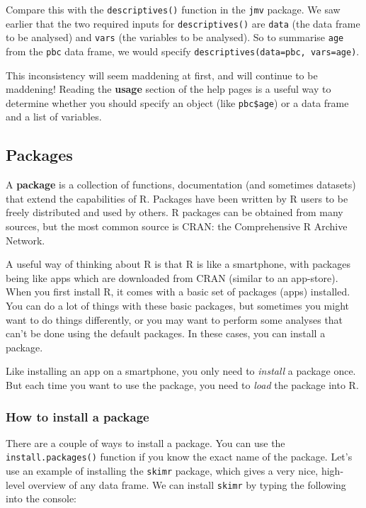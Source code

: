 \documentclass[
  a4paper,
]{memoir}
\begin{document}
Compare this with the \texttt{descriptives()} function in the
\texttt{jmv} package. We saw earlier that the two required inputs for
\texttt{descriptives()} are \texttt{data} (the data frame to be
analysed) and \texttt{vars} (the variables to be analysed). So to
summarise \texttt{age} from the \texttt{pbc} data frame, we would
specify \texttt{descriptives(data=pbc,\ vars=age)}.

This inconsistency will seem maddening at first, and will continue to be
maddening! Reading the \textbf{usage} section of the help pages is a
useful way to determine whether you should specify an object (like
\texttt{pbc\$age}) or a data frame and a list of variables.

\hypertarget{packages}{%
\subsection{Packages}\label{packages}}

A \textbf{package} is a collection of functions, documentation (and
sometimes datasets) that extend the capabilities of R. Packages have
been written by R users to be freely distributed and used by others. R
packages can be obtained from many sources, but the most common source
is CRAN: the Comprehensive R Archive Network.

A useful way of thinking about R is that R is like a smartphone, with
packages being like apps which are downloaded from CRAN (similar to an
app-store). When you first install R, it comes with a basic set of
packages (apps) installed. You can do a lot of things with these basic
packages, but sometimes you might want to do things differently, or you
may want to perform some analyses that can't be done using the default
packages. In these cases, you can install a package.

Like installing an app on a smartphone, you only need to \emph{install}
a package once. But each time you want to use the package, you need to
\emph{load} the package into R.

\hypertarget{how-to-install-a-package}{%
\subsubsection{How to install a
package}\label{how-to-install-a-package}}

There are a couple of ways to install a package. You can use the
\texttt{install.packages()} function if you know the exact name of the
package. Let's use an example of installing the \texttt{skimr} package,
which gives a very nice, high-level overview of any data frame. We can
install \texttt{skimr} by typing the following into the console:
\end{document}
